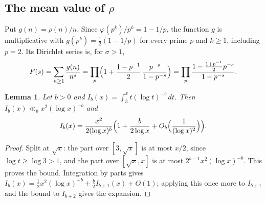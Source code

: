 \documentclass[11pt]{article}
\newtheorem{lemma}[theorem]{Lemma}
\theoremstyle{definition}
\renewcommand{\phi}{\varphi}
\begin{document}
\subsection{The mean value of \texorpdfstring{$\rho$}{rho}}

Put $g(n)=\rho(n)/n$. Since $\phi(p^k)/p^k=1-1/p$, the function $g$ is multiplicative with $g(p^k)=\tfrac12(1-1/p)$ for every prime $p$ and $k\ge1$, including $p=2$. Its Dirichlet series is, for $\sigma>1$,
\begin{equation}\label{eq:Fg}
  F(s)=\sum_{n\ge1}\frac{g(n)}{n^{s}}=\prod_p\Bigl(1+\frac{1-p^{-1}}{2}\,\frac{p^{-s}}{1-p^{-s}}\Bigr)=\prod_p\frac{1-\frac{1+p^{-1}}{2}p^{-s}}{1-p^{-s}} .
\end{equation}

\begin{lemma}\label{lem:int}
Let $b>0$ and $I_b(x)=\int_3^xt(\log t)^{-b}\,dt$. Then $I_b(x)\ll_b x^2(\log x)^{-b}$ and
\[
  I_b(x)=\frac{x^2}{2(\log x)^{b}}\Bigl(1+\frac{b}{2\log x}+O_b\Bigl(\frac1{(\log x)^2}\Bigr)\Bigr).
\]
\end{lemma}

\begin{proof}
Split at $\sqrt x$: the part over $[3,\sqrt x]$ is at most $x/2$, since $\log t\ge\log3>1$, and the part over $[\sqrt x,x]$ is at most $2^{b-1}x^2(\log x)^{-b}$. This proves the bound. Integration by parts gives $I_b(x)=\tfrac12x^2(\log x)^{-b}+\tfrac b2I_{b+1}(x)+O(1)$; applying this once more to $I_{b+1}$ and the bound to $I_{b+2}$ gives the expansion.
\end{proof}
\end{document}
